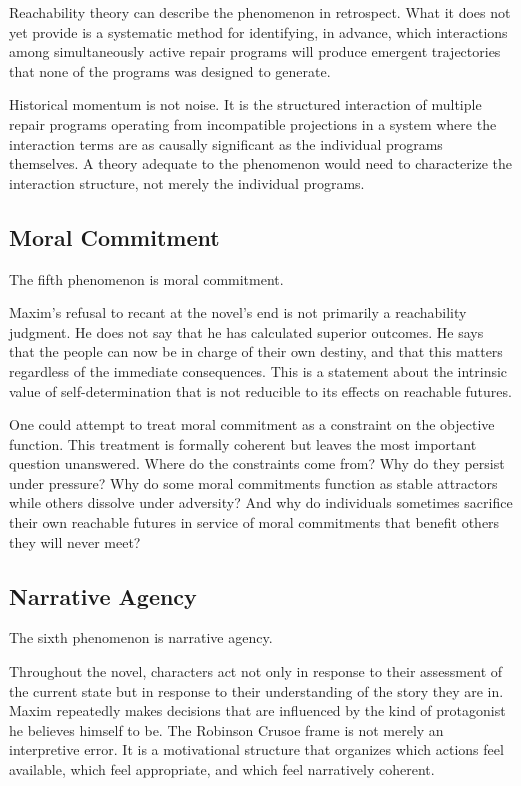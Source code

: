 \documentclass[12pt, a4paper]{article}
\theoremstyle{plain}
\theoremstyle{definition}
\theoremstyle{remark}
\begin{document}
Reachability theory can describe the phenomenon
in retrospect. What it does not yet provide is
a systematic method for identifying, in advance,
which interactions among simultaneously active
repair programs will produce emergent trajectories
that none of the programs was designed to generate.

Historical momentum is not noise. It is the
structured interaction of multiple repair programs
operating from incompatible projections in a system
where the interaction terms are as causally
significant as the individual programs themselves.
A theory adequate to the phenomenon would need to
characterize the interaction structure, not merely
the individual programs.

\subsection{Moral Commitment}

The fifth phenomenon is moral commitment.

Maxim's refusal to recant at the novel's end is
not primarily a reachability judgment. He does not
say that he has calculated superior outcomes. He
says that the people can now be in charge of their
own destiny, and that this matters regardless of
the immediate consequences. This is a statement
about the intrinsic value of self-determination
that is not reducible to its effects on reachable
futures.

One could attempt to treat moral commitment as
a constraint on the objective function. This
treatment is formally coherent but leaves the
most important question unanswered. Where do
the constraints come from? Why do they persist
under pressure? Why do some moral commitments
function as stable attractors while others
dissolve under adversity? And why do individuals
sometimes sacrifice their own reachable futures
in service of moral commitments that benefit
others they will never meet?

\subsection{Narrative Agency}

The sixth phenomenon is narrative agency.

Throughout the novel, characters act not only in
response to their assessment of the current state
but in response to their understanding of the
story they are in. Maxim repeatedly makes decisions
that are influenced by the kind of protagonist he
believes himself to be. The Robinson Crusoe frame
is not merely an interpretive error. It is a
motivational structure that organizes which actions
feel available, which feel appropriate, and which
feel narratively coherent.
\end{document}
